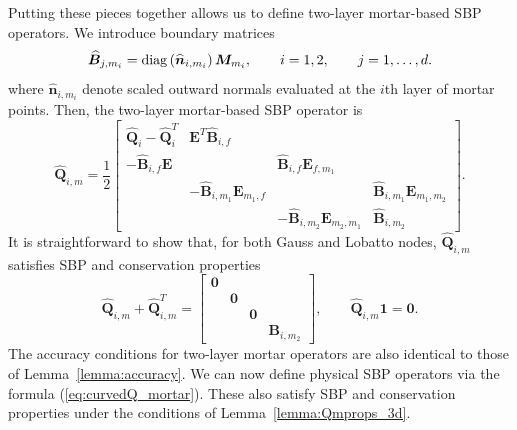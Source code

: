 \documentclass{svjour3}                     %
\renewcommand{\hat}{\widehat}
\newcommand{\diag}[1]{{\rm diag}\LRp{#1}}
\newcommand{\LRp}[1]{\left( #1 \right)}
\begin{document}
Putting these pieces together allows us to define two-layer mortar-based SBP operators.  We introduce boundary matrices 
\[
\hat{\bm{B}}_{j,m_i} = \diag{\hat{\bm{n}}_{i,m_i}}\bm{M}_{m_i}, \qquad i = 1,2, \qquad j = 1,\ldots, d.
\]
where $\hat{\bm{n}}_{i,m_i}$ denote scaled outward normals evaluated at the $i$th layer of mortar points.  Then, the two-layer mortar-based SBP operator is
\begin{equation}
\hat{\bm{Q}}_{i,m} = \frac{1}{2}\begin{bmatrix}
\hat{\bm{Q}}_i - \hat{\bm{Q}}_i^T & \bm{E}^T\hat{\bm{B}}_{i,f} & & \\
-\hat{\bm{B}}_{i,f}\bm{E} & & \hat{\bm{B}}_{i,f} \bm{E}_{f,m_1} &\\
& -\hat{\bm{B}}_{i,m_1} \bm{E}_{m_1,f} & & \hat{\bm{B}}_{i,m_1}\bm{E}_{m_1,m_2} \\
&& -\hat{\bm{B}}_{i,m_2} \bm{E}_{m_2,m_1} & \hat{\bm{B}}_{i,m_2} 
\end{bmatrix}.
\end{equation}
It is straightforward to show that, for both Gauss and Lobatto nodes, $\hat{\bm{Q}}_{i,m}$ satisfies SBP and conservation properties
\[
\hat{\bm{Q}}_{i,m} + \hat{\bm{Q}}_{i,m}^T = \begin{bmatrix}
\bm{0} & & &\\
& \bm{0} & &\\ 
& & \bm{0} & \\
& & & \bm{B}_{i,m_2}
\end{bmatrix}, \qquad \hat{\bm{Q}}_{i,m}\bm{1} = \bm{0}.
\]
The accuracy conditions for two-layer mortar operators are also identical to those of Lemma~\ref{lemma:accuracy}.  We can now define physical SBP operators via the formula (\ref{eq:curvedQ_mortar}).  These also satisfy SBP and conservation properties under the conditions of Lemma~\ref{lemma:Qmprops_3d}.  
\end{document}
